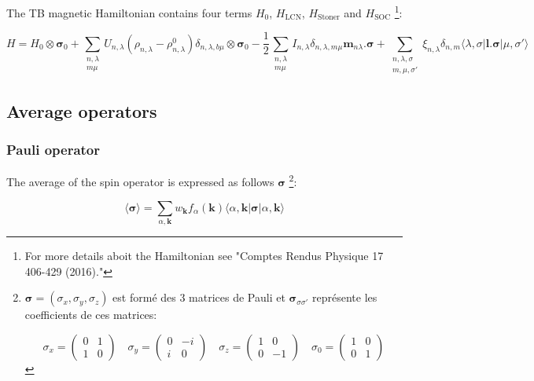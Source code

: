 \documentclass{article}
\newcommand{\bra}[1]{\langle #1|}
\newcommand{\ket}[1]{|#1\rangle}
\begin{document}
\noindent The TB magnetic Hamiltonian contains four terms $H_0$, $H_{\text{LCN}}$, $H_{\text{Stoner}}$ and $H_{\text{SOC}}$ \footnote{\noindent For more details aboit the Hamiltonian see "Comptes Rendus Physique 17 406-429 (2016)."}:


\[\displaystyle H=H_0\otimes\bm{\sigma}_0
+\sum_{\substack{n,\lambda\\m \mu} } U_{n,\lambda}
(\rho_{n,\lambda}-\rho_{n,\lambda}^0) \delta_{n,\lambda,b \mu
}\otimes\bm{\sigma}_0 -\frac{1}{2}\sum_{\substack{n,\lambda\\m \mu}} I_{n,\lambda} \delta_{n,\lambda,m \mu } \mathbf{m}_{n \lambda}.\bm{\sigma}  
+ \sum_{\substack{n,\lambda, \sigma\\ m, \mu, \sigma'} } \xi_{n,\lambda} \delta_{n,m} 
\bra{\lambda,\sigma} \mathbf{l}.\mathbf{\sigma}\ket{\mu,\sigma'}
\]


\subsection{Average operators}


\subsubsection{Pauli operator}

\noindent
The average of the spin operator is expressed as follows
$\bm{\sigma}$
\footnote{\noindent 
${\bm{\sigma}}=(\sigma_x,\sigma_y,\sigma_z)$ est
form\'e des 3 matrices de Pauli et $\bm{\sigma}_{\sigma \sigma'}$ repr\'esente les coefficients de ces matrices:


\[ \sigma_x=\left( \begin{array}{cc} 0 & 1 \\ 1 & 0 \end{array} \right) 
\quad
\sigma_y=\left( \begin{array}{cc} 0 & -i \\ i & 0 \end{array} \right) \quad
\sigma_z=\left( \begin{array}{cc} 1 & 0 \\ 0 & -1 \end{array} \right) \quad
\sigma_0=\left( \begin{array}{cc} 1 & 0 \\ 0 & 1 \end{array}\right) \]}: 

\[ \langle \bm{\sigma}\rangle= \sum_{\alpha,\mathbf{k}}
w_{\mathbf{k}}f_{\alpha}(\mathbf{k}) \bra{\alpha,\mathbf{k}}\bm{\sigma}\ket{\alpha,\mathbf{k}}\]
\end{document}
